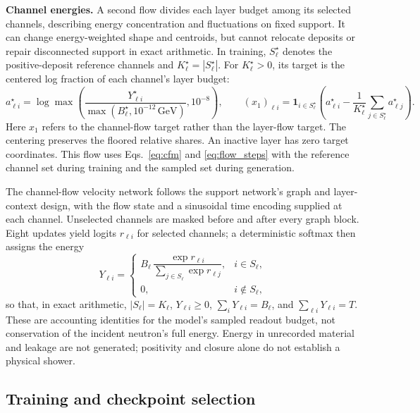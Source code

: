 \documentclass[10pt]{article}
\newcommand{\GeV}{\,\mathrm{GeV}}
\begin{document}
\textbf{Channel energies.} A second flow divides each layer budget among its selected channels, describing energy concentration and fluctuations on fixed support. It can change energy-weighted shape and centroids, but cannot relocate deposits or repair disconnected support in exact arithmetic. In training, $S_\ell^\star$ denotes the positive-deposit reference channels and $K_\ell^\star=|S_\ell^\star|$. For $K_\ell^\star>0$, its target is the centered log fraction of each channel's layer budget:
\begin{equation}
 a_{\ell i}^\star=\log\max\!\left(
 \frac{Y_{\ell i}^\star}{\max(B_\ell^\star,10^{-12}\GeV)},10^{-8}\right),\qquad
 (x_1)_{\ell i}=\mathbf 1_{i\in S_\ell^\star}
 \left(a_{\ell i}^\star-\frac{1}{K_\ell^\star}
 \sum_{j\in S_\ell^\star}a_{\ell j}^\star\right).
 \label{eq:share_target}
\end{equation}
Here $x_1$ refers to the channel-flow target rather than the layer-flow target. The centering preserves the floored relative shares. An inactive layer has zero target coordinates. This flow uses Eqs.~\eqref{eq:cfm} and \eqref{eq:flow_steps} with the reference channel set during training and the sampled set during generation.

The channel-flow velocity network follows the support network's graph and layer-context design, with the flow state and a sinusoidal time encoding supplied at each channel. Unselected channels are masked before and after every graph block. Eight updates yield logits $r_{\ell i}$ for selected channels; a deterministic softmax then assigns the energy
\begin{equation}
 Y_{\ell i}=
 \begin{cases}
 B_\ell\,\dfrac{\exp r_{\ell i}}{\sum_{j\in S_\ell}\exp r_{\ell j}}, & i\in S_\ell,\\[6pt]
 0, & i\notin S_\ell,
 \end{cases}
 \label{eq:decoder}
\end{equation}
so that, in exact arithmetic, $|S_\ell|=K_\ell$, $Y_{\ell i}\geq0$, $\sum_iY_{\ell i}=B_\ell$, and $\sum_{\ell i}Y_{\ell i}=T$. These are accounting identities for the model's sampled readout budget, not conservation of the incident neutron's full energy. Energy in unrecorded material and leakage are not generated; positivity and closure alone do not establish a physical shower.

\subsection{Training and checkpoint selection}
\end{document}
